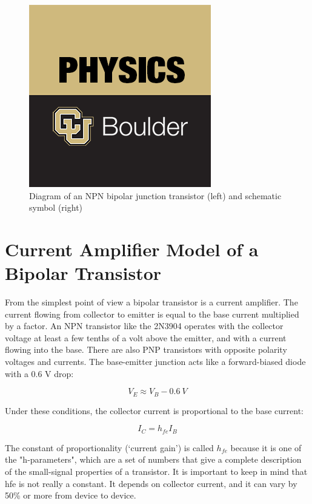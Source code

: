 \documentclass[10pt]{PhysLab1C} %
\begin{document}
\begin{figure}
    \centering
    \includegraphics{tmp.png}
    \caption{Diagram of an NPN bipolar junction transistor (left) and schematic symbol (right)}
    \label{NPN}
\end{figure}


\section{Current Amplifier Model of a Bipolar Transistor}

From the simplest point of view a bipolar transistor is a current amplifier. The current flowing from collector to
emitter is equal to the base current multiplied by a factor. An NPN transistor like the 2N3904 operates with the
collector voltage at least a few tenths of a volt above the emitter, and with a current flowing into the base.
There are also PNP transistors with opposite polarity voltages and currents. The base-emitter junction acts like
a forward-biased diode with a 0.6 V drop:

$$V_E \approx V_B-0.6~V$$

Under these conditions, the collector current is proportional to the base current:

$$I_C = h_{fe}I_B$$

The constant of proportionality (‘current gain’) is called $h_{fe}$ because it is one of the "h-parameters", which are a
set of numbers that give a complete description of the small-signal properties of a transistor. It is important to
keep in mind that hfe is not really a constant. It depends on collector current, and it can vary by 50\% or more
from device to device.
\end{document}
